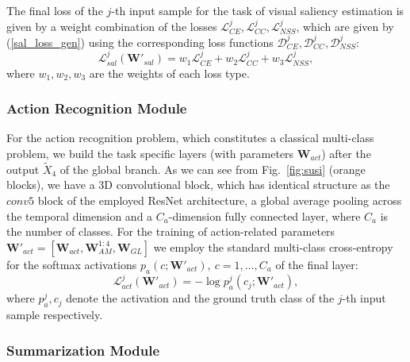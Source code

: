 \documentclass[10pt,twocolumn,letterpaper]{article}
\begin{document}
The final loss of the $j$-th input sample for the task of visual saliency estimation is given by a weight combination of the losses $\mathcal{L}^j_{CE}, \mathcal{L}^j_{CC}, \mathcal{L}^j_{NSS}$, which are given by (\ref{sal_loss_gen}) using the corresponding loss functions $\mathcal{D}^j_{CE}, \mathcal{D}^j_{CC}, \mathcal{D}^j_{NSS}$:
\begin{equation}
\mathcal{L}_{sal}^j(\mathbf{W'}_{sal}) = w_{1}\mathcal{L}^j_{CE} + w_{2}\mathcal{L}^j_{CC} + w_{3}\mathcal{L}_{NSS}^j,
\end{equation}  
where $w_1,w_2,w_3$ are the weights of each loss type.

\subsubsection{Action Recognition Module}

For the action recognition problem, which constitutes a classical multi-class problem, we build the task specific layers (with parameters $\mathbf{W}_{act}$) after the output $\tilde{X}_4$ of the global branch. As we can see from Fig.~\ref{fig:susi} (orange blocks), we have a 3D convolutional block, which has identical structure as the $conv5$ block of the employed ResNet architecture, a global average pooling across the temporal dimension and a $C_a$-dimension fully connected layer, where $C_a$ is the number of classes. For the training of action-related parameters $\mathbf{W'}_{act}=[\mathbf{W}_{act}, \mathbf{W}_{AM}^{1:4}, \mathbf{W}_{GL}]$ we employ the standard multi-class cross-entropy for the softmax activations $p_a(c;\mathbf{W}'_{act}),\:c=1,\ldots, C_a$ of the final layer:
\begin{equation}
\mathcal{L}^j_{act}(\mathbf{W}'_{act})=-\log p_a^j(c_j;\mathbf{W}'_{act}),
\end{equation}
where $p_a^j, c_j$ denote the activation and the ground truth class of the $j$-th input sample respectively.

\subsubsection{Summarization Module}
\end{document}
